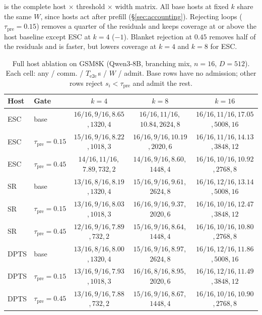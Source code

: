  is the complete host $\times$ threshold $\times$ width matrix.
All base hosts at fixed $k$ share the same $W$, since hosts act after prefill (\S\ref{sec:accounting}).
Rejecting loops ($\tau_{\mathrm{pre}}{=}0.15$) removes a quarter of the residuals
and keeps coverage at or above the host baseline except ESC at $k{=}4$ ($-1$).
Blanket rejection at $0.45$ removes half of the residuals and is faster, but
lowers coverage at $k{=}4$ and $k{=}8$ for ESC.

\begin{table}[t]
\centering
\caption{Full host ablation on GSM8K (Qwen3-8B, branching mix, $n{=}16$, $D{=}512$).
Each cell: any / comm. / $T_{\mathrm{e2e}}$\,s / $W$ / admit.
Base rows have no admission; other rows reject $s_i{<}\tau_{\mathrm{pre}}$ and admit the rest.}
\label{tab:ablate-thresh}
\scriptsize
\setlength{\tabcolsep}{2.4pt}
\begin{tabular}{@{}llccc@{}}
\toprule
Host & Gate & $k{=}4$ & $k{=}8$ & $k{=}16$ \\
\midrule
ESC
 & base
 & $16/16$,\,$9/16$,\,$8.65$,\,$1320$,\,$4$
 & $16/16$,\,$11/16$,\,$10.84$,\,$2624$,\,$8$
 & $16/16$,\,$11/16$,\,$17.05$,\,$5008$,\,$16$ \\
\rowcolor{tblalt}
ESC
 & $\tau_{\mathrm{pre}}{=}0.15$
 & $15/16$,\,$9/16$,\,$8.22$,\,$1018$,\,$3$
 & $16/16$,\,$9/16$,\,$10.19$,\,$2020$,\,$6$
 & $16/16$,\,$11/16$,\,$14.13$,\,$3848$,\,$12$ \\
ESC
 & $\tau_{\mathrm{pre}}{=}0.45$
 & $14/16$,\,$11/16$,\,$7.89$,\,$732$,\,$2$
 & $14/16$,\,$9/16$,\,$8.60$,\,$1448$,\,$4$
 & $16/16$,\,$10/16$,\,$10.92$,\,$2768$,\,$8$ \\
\midrule
SR
 & base
 & $13/16$,\,$8/16$,\,$8.19$,\,$1320$,\,$4$
 & $15/16$,\,$9/16$,\,$9.61$,\,$2624$,\,$8$
 & $16/16$,\,$12/16$,\,$13.14$,\,$5008$,\,$16$ \\
\rowcolor{tblalt}
SR
 & $\tau_{\mathrm{pre}}{=}0.15$
 & $13/16$,\,$9/16$,\,$8.03$,\,$1018$,\,$3$
 & $16/16$,\,$9/16$,\,$9.37$,\,$2020$,\,$6$
 & $16/16$,\,$10/16$,\,$12.47$,\,$3848$,\,$12$ \\
SR
 & $\tau_{\mathrm{pre}}{=}0.45$
 & $12/16$,\,$9/16$,\,$7.89$,\,$732$,\,$2$
 & $15/16$,\,$9/16$,\,$8.64$,\,$1448$,\,$4$
 & $16/16$,\,$10/16$,\,$10.80$,\,$2768$,\,$8$ \\
\midrule
DPTS
 & base
 & $13/16$,\,$8/16$,\,$8.00$,\,$1320$,\,$4$
 & $15/16$,\,$9/16$,\,$8.97$,\,$2624$,\,$8$
 & $16/16$,\,$12/16$,\,$11.86$,\,$5008$,\,$16$ \\
\rowcolor{tblalt}
DPTS
 & $\tau_{\mathrm{pre}}{=}0.15$
 & $13/16$,\,$9/16$,\,$7.93$,\,$1018$,\,$3$
 & $16/16$,\,$8/16$,\,$8.95$,\,$2020$,\,$6$
 & $16/16$,\,$12/16$,\,$11.49$,\,$3848$,\,$12$ \\
DPTS
 & $\tau_{\mathrm{pre}}{=}0.45$
 & $13/16$,\,$9/16$,\,$7.88$,\,$732$,\,$2$
 & $15/16$,\,$9/16$,\,$8.67$,\,$1448$,\,$4$
 & $16/16$,\,$10/16$,\,$10.90$,\,$2768$,\,$8$ \\
\bottomrule
\end{tabular}
\end{table}

